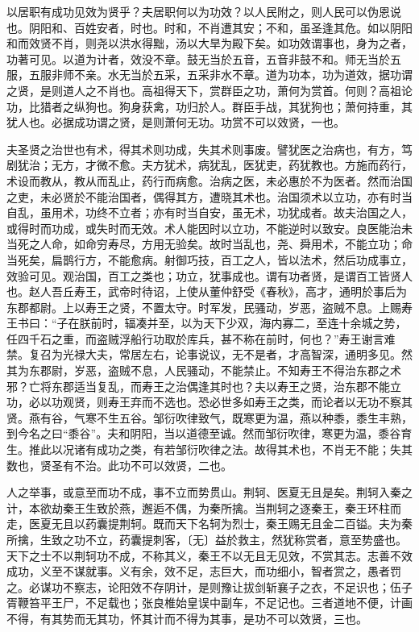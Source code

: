 \documentclass[]{article}
\begin{document}
以居职有成功见效为贤乎？夫居职何以为功效？以人民附之，则人民可以伪恩说也。阴阳和、百姓安者，时也。时和，不肖遭其安；不和，虽圣逢其危。如以阴阳和而效贤不肖，则尧以洪水得黜，汤以大旱为殿下矣。如功效谓事也，身为之者，功著可见。以道为计者，效没不章。鼓无当於五音，五音非鼓不和。师无当於五服，五服非师不亲。水无当於五采，五采非水不章。道为功本，功为道效，据功谓之贤，是则道人之不肖也。高祖得天下，赏群臣之功，萧何为赏首。何则？高祖论功，比猎者之纵狗也。狗身获禽，功归於人。群臣手战，其犹狗也；萧何持重，其犹人也。必据成功谓之贤，是则萧何无功。功赏不可以效贤，一也。

夫圣贤之治世也有术，得其术则功成，失其术则事废。譬犹医之治病也，有方，笃剧犹治；无方，才微不愈。夫方犹术，病犹乱，医犹吏，药犹教也。方施而药行，术设而教从，教从而乱止，药行而病愈。治病之医，未必惠於不为医者。然而治国之吏，未必贤於不能治国者，偶得其方，遭晓其术也。治国须术以立功，亦有时当自乱，虽用术，功终不立者；亦有时当自安，虽无术，功犹成者。故夫治国之人，或得时而功成，或失时而无效。术人能因时以立功，不能逆时以致安。良医能治未当死之人命，如命穷寿尽，方用无验矣。故时当乱也，尧、舜用术，不能立功；命当死矣，扁鹊行方，不能愈病。射御巧技，百工之人，皆以法术，然后功成事立，效验可见。观治国，百工之类也；功立，犹事成也。谓有功者贤，是谓百工皆贤人也。赵人吾丘寿王，武帝时待诏，上使从董仲舒受《春秋》，高才，通明於事后为东郡都尉。上以寿王之贤，不置太守。时军发，民骚动，岁恶，盗贼不息。上赐寿王书曰：``子在朕前时，辐凑并至，以为天下少双，海内寡二，至连十余城之势，任四千石之重，而盗贼浮船行功取於库兵，甚不称在前时，何也？''寿王谢言难禁。复召为光禄大夫，常居左右，论事说议，无不是者，才高智深，通明多见。然其为东郡尉，岁恶，盗贼不息，人民骚动，不能禁止。不知寿王不得治东郡之术邪？亡将东郡适当复乱，而寿王之治偶逢其时也？夫以寿王之贤，治东郡不能立功，必以功观贤，则寿王弃而不选也。恐必世多如寿王之类，而论者以无功不察其贤。燕有谷，气寒不生五谷。邹衍吹律致气，既寒更为温，燕以种黍，黍生丰熟，到今名之曰``黍谷''。夫和阴阳，当以道德至诚。然而邹衍吹律，寒更为温，黍谷育生。推此以况诸有成功之类，有若邹衍吹律之法。故得其术也，不肖无不能；失其数也，贤圣有不治。此功不可以效贤，二也。

人之举事，或意至而功不成，事不立而势贯山。荆轲、医夏无且是矣。荆轲入秦之计，本欲劫秦王生致於燕，邂逅不偶，为秦所擒。当荆轲之逐秦王，秦王环柱而走，医夏无且以药囊提荆轲。既而天下名轲为烈士，秦王赐无且金二百镒。夫为秦所擒，生致之功不立，药囊提刺客，〔无〕益於救主，然犹称赏者，意至势盛也。天下之士不以荆轲功不成，不称其义，秦王不以无且无见效，不赏其志。志善不效成功，义至不谋就事。义有余，效不足，志巨大，而功细小，智者赏之，愚者罚之。必谋功不察志，论阳效不存阴计，是则豫让拔剑斩襄子之衣，不足识也；伍子胥鞭笞平王尸，不足载也；张良椎始皇误中副车，不足记也。三者道地不便，计画不得，有其势而无其功，怀其计而不得为其事，是功不可以效贤，三也。
\end{document}
